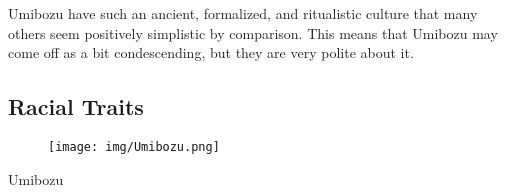 Umibozu have such an ancient, formalized, and ritualistic culture that many others seem positively simplistic by comparison. This means that Umibozu may come off as a bit condescending, but they are very polite about it.

\newpage

\subsection*{Racial Traits}

\begin{figure}[ht!]
	\texttt{[image: img/Umibozu.png]}
\end{figure}


\begin{monsterbox}{Umibozu}
	\vspace{.1in}
	\hline
	\stats[
	STR = -1,
	DEX = -1,
	VIT = +1,
	FOC = +1,
	WILL = +1
	]
	\hline
\end{monsterbox}